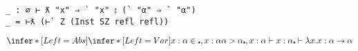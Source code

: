 \begin{listing}[H]
  \centering
  \begin{minipage}{0.6\linewidth}
    \begin{verbatim}
_ : ∅ ⊢ ƛ "x" ⇒ ` "x" ⦂ (` "α" ⇒ ` "α")
_ = ⊢ƛ (⊢` Z (Inst SZ refl refl))
    \end{verbatim}
  \end{minipage}%
  \begin{minipage}{0.4\linewidth}
    \[
      \infer*[Left=Abs]{
        \infer*[Left=Var]{
          x : \alpha \in \centerdot, x : \alpha \\
          \alpha > \alpha
        }{
          \centerdot , x : \alpha \vdash x : \alpha
        }
      }
      {\centerdot \vdash \lambda x . x : \alpha \rightarrow \alpha}
    \]
  \end{minipage}
\end{listing}

